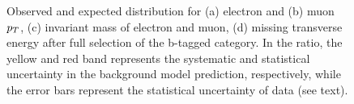 \begin{figure}[!hp]
\begin{center}
    \end{center}
    \caption{ Observed and expected distribution for (a) electron and (b) muon $p_{T}$, (c) invariant mass of electron and muon, (d) missing transverse energy
	after full selection of the b-tagged category.
	 In the ratio, the yellow and red band represents the systematic and statistical uncertainty in the background model prediction, 
	respectively,  while the error bars represent the statistical uncertainty of data (see text).}
   \label{fig:somefinaldistro1}
\end{figure}

